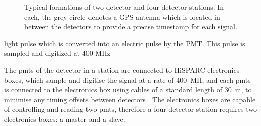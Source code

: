 \begin{figure}[ht!]
	\centering
	\qquad
	\qquad
	\caption{Typical formations of two-detector and four-detector stations. In each, the grey circle denotes a GPS antenna which is located in between the detectors to provide a precise timestamp for each signal.}
	\label{fig:HS_station_layouts}
\end{figure}


light pulse which is converted
into an electric pulse by the PMT. This pulse is
sampled and digitized at 400 MHz

The \glspl{pmt} of the detector in a station are connected to HiSPARC electronics boxes, which sample and digitise the signal at a rate of 400~MH, and each \glspl{pmt} is connected to the electronics box using cables of a standard length of 30~m, to minimise any timing offsets between detectors \citep{fokkema_hisparc_2012, van_dam_hisparc_2020}. The electronics boxes are capable of controlling and reading two \glspl{pmt}, therefore a four-detector station requires two electronics boxes: a master and a slave.

